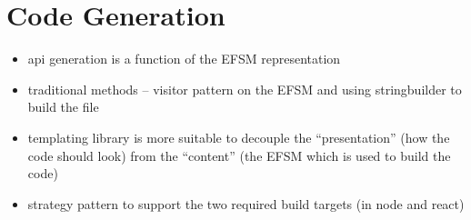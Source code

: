 \section{Code Generation}

\begin{itemize}
\item api generation is a function of the EFSM representation
\item traditional methods -- visitor pattern on the EFSM and using stringbuilder to build the file
\item templating library is more suitable to decouple the ``presentation'' (how the code should look) from the ``content'' (the EFSM which is used to build the code)
\item strategy pattern to support the two required build targets (in node and react)
\end{itemize}
